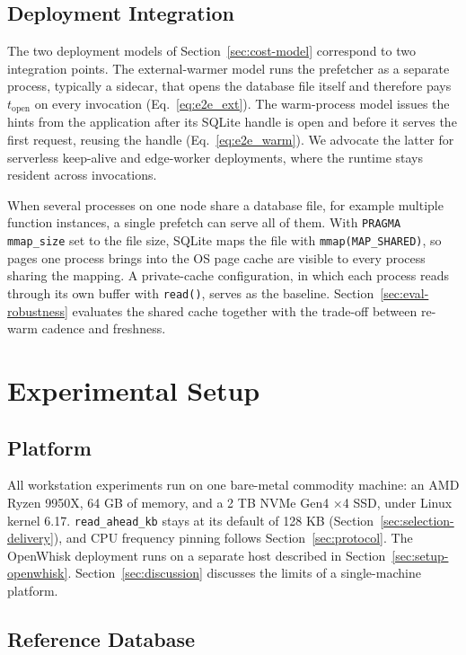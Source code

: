 \documentclass[sigconf, nonacm]{acmart}
\begin{document}
\subsection{Deployment Integration}\label{sec:deployment}

The two deployment models of Section~\ref{sec:cost-model} correspond to two integration points. The external-warmer model runs the prefetcher as a separate process, typically a sidecar, that opens the database file itself and therefore pays $t_\text{open}$ on every invocation (Eq.~\ref{eq:e2e_ext}). The warm-process model issues the hints from the application after its SQLite handle is open and before it serves the first request, reusing the handle (Eq.~\ref{eq:e2e_warm}). We advocate the latter for serverless keep-alive and edge-worker deployments, where the runtime stays resident across invocations.

When several processes on one node share a database file, for example multiple function instances, a single prefetch can serve all of them. With \texttt{PRAGMA mmap\_size} set to the file size, SQLite maps the file with \texttt{mmap(MAP\_SHARED)}, so pages one process brings into the OS page cache are visible to every process sharing the mapping. A private-cache configuration, in which each process reads through its own buffer with \texttt{read()}, serves as the baseline. Section~\ref{sec:eval-robustness} evaluates the shared cache together with the trade-off between re-warm cadence and freshness.

\section{Experimental Setup}\label{sec:setup}

\subsection{Platform}\label{sec:platform}

All workstation experiments run on one bare-metal commodity machine: an AMD Ryzen 9950X, 64 GB of memory, and a 2 TB NVMe Gen4 ×4 SSD, under Linux kernel 6.17. \texttt{read\_ahead\_kb} stays at its default of 128 KB (Section~\ref{sec:selection-delivery}), and CPU frequency pinning follows Section~\ref{sec:protocol}. The OpenWhisk deployment runs on a separate host described in Section~\ref{sec:setup-openwhisk}. Section~\ref{sec:discussion} discusses the limits of a single-machine platform.

\subsection{Reference Database}\label{sec:refdb}
\end{document}
